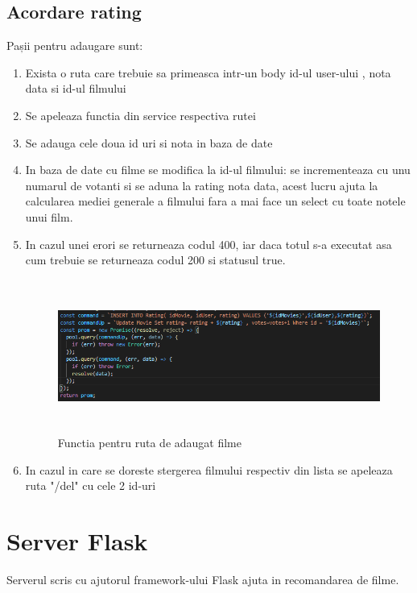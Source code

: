 \subsection{Acordare rating}
\par Pașii pentru adaugare sunt:
\begin{enumerate}
  	\item Exista o ruta care trebuie sa primeasca intr-un body id-ul user-ului , nota data si id-ul filmului
  	\item Se apeleaza functia din service respectiva rutei
	\item Se adauga cele doua id uri si nota in baza de date 
	\item In baza de date cu filme se modifica la id-ul filmului: se incrementeaza cu unu numarul de votanti si se aduna la rating nota data, acest lucru ajuta la calcularea mediei generale a filmului fara a mai face un select cu toate notele unui film.
  	\item In cazul unei erori se returneaza codul 400, iar daca totul s-a executat asa cum trebuie se returneaza codul 200 si statusul true.
		\begin{figure}[htbp]
			\centerline{\includegraphics[width=15cm, height=5cm]{figures/functie rating.png}}
			\caption{Functia pentru ruta de adaugat filme}
			\label{fig}
		\end{figure}	
	\item In cazul in care se doreste stergerea filmului respectiv din lista se apeleaza ruta "/del" cu cele 2 id-uri
\end{enumerate}

\section{Server Flask}
\label{sec:ch5sec1}

\par Serverul scris cu ajutorul framework-ului Flask ajuta in recomandarea de filme.
